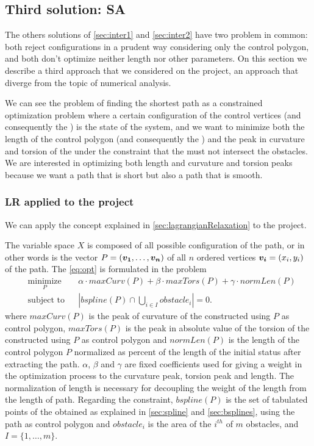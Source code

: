 \documentclass[dissertation.tex]{subfiles}
\begin{document}
\subsection{Third solution: \acf{SA}}\label{sec:inter3}
The others solutions of \cref{sec:inter1} and \cref{sec:inter2} have two
problem in common: both reject configurations in a prudent way
considering only the control polygon, and both don't optimize neither
length nor other parameters. On this section we describe a third
approach that we considered on the project, an approach that diverge
from the topic of numerical analysis.

We can see the problem of finding the shortest path as a constrained
optimization problem where a certain configuration of the control
vertices (and
consequently the \bs) is the state of the system, and we want to
minimize both the length of the control polygon (and consequently the
\bs) and the peak in curvature and torsion of the \bs under
the constraint that the \bs must not intersect the obstacles. We
are interested in optimizing both length and curvature and torsion
peaks because we want a path that is short but also a path that is
smooth.

\subsubsection{\acf{LR} applied to the project}
We can apply the concept explained in \cref{sec:lagrangianRelaxation}
to the project.

The variable space $X$ is composed of all possible
configuration of the path, or in other words is the vector
$P=(\boldsymbol{v_1},\dots,\boldsymbol{v_n})$ of all $n$ ordered
vertices $\boldsymbol{v_i}=(x_i,y_i)$ of the
path. The \cref{eq:opt} is formulated in the problem
\begin{equation*}
  \begin{aligned}
    & \underset{P}{\text{minimize}}
    & & \alpha\cdot maxCurv(P)+\beta\cdot
    maxTors(P)+\gamma\cdot normLen(P) \\
    & \text{subject to}
    & & \left|bspline(P)\cap \bigcup_{i\in I}obstacle_i\right| = 0.
  \end{aligned}
\end{equation*}
where $maxCurv(P)$ is the peak of curvature of the \bs
constructed using $P$ as control polygon,
$maxTors(P)$ is the peak in absolute value of the torsion of
the \bs constructed using $P$ as control polygon and
$normLen(P)$ is the length of the control polygon
$P$ normalized as percent of the length of the initial status
after extracting the path. $\alpha$, $\beta$ and $\gamma$ are fixed
coefficients used for giving a weight in the optimization process to
the curvature peak, torsion peak and length. The normalization of
length is necessary for decoupling the weight of the length from the
length of path. Regarding the constraint, $bspline(P)$
is the set of tabulated points of the \emph{\bs} obtained as
explained in
\cref{sec:spline} and \cref{sec:bsplines}, using the path as
control polygon and
$obstacle_i$ is the area of the $i^{th}$ of $m$ obstacles, and
$I=\{1,\dots,m\}$.
\end{document}
